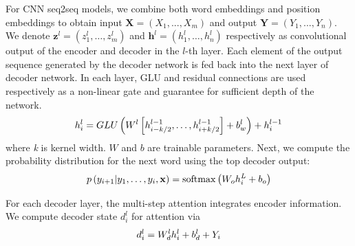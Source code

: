 
For CNN seq2seq models, we combine both word embeddings and position embeddings to obtain input $\mathbf{X} = (X_1,...,X_m)$ and output $\mathbf{Y}=(Y_1,...,Y_n)$. 
We denote $\mathbf { z } ^ { l } = \left( z _ { 1 } ^ { l } , \ldots , z _ { m     } ^ { l } \right)$ and $\mathbf { h } ^ { l } = \left( h _ { 1 } ^ { l } , \ldots , h _ { n } ^ { l } \right)$ 
respectively as convolutional output of the encoder and
decoder in the $l$-th layer.
Each element of the output
sequence generated by the decoder network is fed
back into the next layer of decoder network.
In each layer, GLU \citep{DauphinFAG17} and residual connections \citep{HeZRS16}
are used respectively as a non-linear gate and guarantee for sufficient depth of the network.  
\begin{equation}
\small
    h _ { i } ^ { l } = GLU \left( W ^ { l } \left[ h _ {i-k/2 } ^ { l - 1 } , \ldots , h _ { i+k/2 } ^ { l - 1 } \right] + b _ { w } ^ { l } \right) + h _ { i } ^ { l - 1 }
\end{equation} 
where \textit{k} is kernel width. $W$ and $b$ are trainable parameters.
Next, we compute the probability distribution for the next word
using the top decoder output:
\begin{equation}
\small
    p \left( y _ { i + 1 } | y _ { 1 } , \ldots , y _ { i } , \mathbf { x } \right) = \operatorname { softmax } \left( W _ { o } h _ { i } ^ { L } + b _ { o } \right)
\end{equation}

For each decoder layer, the multi-step attention integrates encoder information. 
We compute decoder state $d_{i}^{l}$ for attention via
\begin{equation}
\small
    d _ { i } ^ { l } = W _ { d } ^ { l } h _ { i } ^ { l } + b _ { d } ^ { l } + Y _ { i }
\end{equation}

